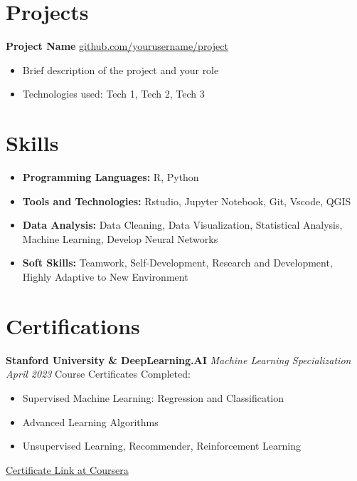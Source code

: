 \documentclass[a4paper,12pt]{article}
\begin{document}
\section*{Projects}
\noindent
\textbf{Project Name} \hfill \href{https://github.com/yourusername/project}{github.com/yourusername/project} \newline
\vspace{-1.5em} %
\begin{itemize}
    \item Brief description of the project and your role
    \item Technologies used: Tech 1, Tech 2, Tech 3
\end{itemize}

\section*{Skills}
\begin{itemize}
    \item \textbf{Programming Languages:} R, Python
    \item \textbf{Tools and Technologies:} Rstudio, Jupyter Notebook, Git, Vscode, QGIS
    \item \textbf{Data Analysis:} Data Cleaning, Data Visualization, Statistical Analysis, Machine Learning, Develop Neural Networks
    \item \textbf{Soft Skills:} Teamwork, Self-Development, Research and Development, Highly Adaptive to New Environment
\end{itemize}

\section*{Certifications}
\noindent
\textbf{Stanford University \& DeepLearning.AI} \newline
\textit{Machine Learning Specialization} \hfill \textit{April 2023} \newline
Course Certificates Completed:
\begin{itemize}
    \item Supervised Machine Learning: Regression and Classification
    \item Advanced Learning Algorithms
    \item Unsupervised Learning, Recommender, Reinforcement Learning
\end{itemize}
\href{https://coursera.org/share/5eee531fdf4f91cc51cef0e16a1a520a}{Certificate Link at Coursera}
\end{document}
